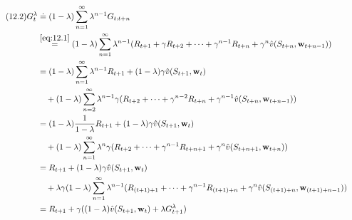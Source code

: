 \begin{solution}
\begin{align} \label{eq:12.2} \tag{12.2}
    G_t^\lambda
    & \doteq
    (1 - \lambda)
    \sum_{n=1}^\infty
        \lambda^{n-1}
        G_{t:t+n} \\
    & \stackrel
    {
        \eqref{eq:12.1}
    }{=}
    (1 - \lambda)
    \sum_{n=1}^\infty
        \lambda^{n-1}
        (R_{t+1} + \gamma R_{t+2} + \cdots + \gamma^{n-1} R_{t+n} + \gamma^n \hat v(S_{t+n}, \mathbf w_{t+n-1})) \notag \\
    & =
    (1 - \lambda)
    \sum_{n=1}^\infty
        \lambda^{n-1}
        R_{t+1}
    +
    (1 - \lambda) \gamma \hat v(S_{t+1}, \mathbf w_t) \notag \\
    & \quad +
    (1 - \lambda)
    \sum_{n=2}^\infty
        \lambda^{n-1}
        \gamma
        (R_{t+2} + \cdots + \gamma^{n-2} R_{t+n} + \gamma^{n-1} \hat v(S_{t+n}, \mathbf w_{t+n-1})) \notag \\
    & =
    (1 - \lambda)
    \frac{1}{1 - \lambda}
    R_{t+1}
    +
    (1 - \lambda) \gamma \hat v(S_{t+1}, \mathbf w_t) \notag \\
    & \quad +
    (1 - \lambda)
    \sum_{n=1}^\infty
        \lambda^n
        \gamma
        (R_{t+2} + \cdots + \gamma^{n-1} R_{t+n+1} + \gamma^n \hat v(S_{t+n+1}, \mathbf w_{t+n})) \notag \\
    & =
    R_{t+1}
    +
    (1 - \lambda) \gamma \hat v(S_{t+1}, \mathbf w_t) \notag \\
    & \quad +
    \lambda
    \gamma
    (1 - \lambda)
    \sum_{n=1}^\infty
        \lambda^{n-1}
        (R_{(t+1)+1} + \cdots + \gamma^{n-1} R_{(t+1)+n} + \gamma^n \hat v(S_{(t+1)+n}, \mathbf w_{(t+1)+n-1})) \notag \\
    & =
    R_{t+1} + \gamma ((1 - \lambda) \hat v(S_{t+1}, \mathbf w_t) + \lambda G_{t+1}^\lambda) \notag
\end{align}

\end{solution}


